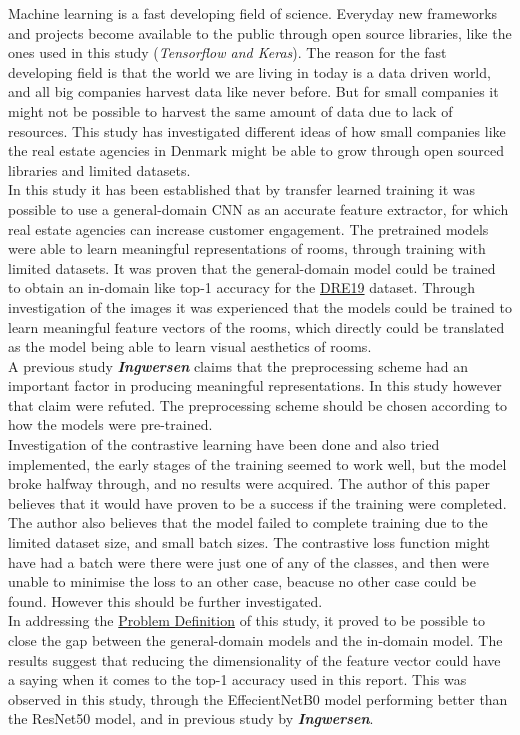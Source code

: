 Machine learning is a fast developing field of science. Everyday new frameworks and projects become available to the public through open source libraries, like the ones used in this study (\textit{Tensorflow and Keras}). The reason for the fast developing field is that the world we are living in today is a data driven world, and all big companies harvest data like never before. But for small companies it might not be possible to harvest the same amount of data due to lack of resources. This study has investigated different ideas of how small companies like the real estate agencies in Denmark might be able to grow through open sourced libraries and limited datasets.
\vspace{3mm}\\
In this study it has been established that by transfer learned training it was possible to use a general-domain CNN as an accurate feature extractor, for which real estate agencies can increase customer engagement. The pretrained models were able to learn meaningful representations of rooms, through training with limited datasets. It was proven that the general-domain model could be trained to obtain an in-domain like top-1 accuracy for the \hyperref[sec:DRE19]{DRE19} dataset. Through investigation of the images it was experienced that the models could be trained to learn meaningful feature vectors of the rooms, which directly could be translated as the model being able to learn visual aesthetics of rooms.
\vspace{3mm}\\
A previous study \textbf{\textit{Ingwersen}}\autocite{Ingwersen} claims that the preprocessing scheme had an important factor in producing meaningful representations. In this study however that claim were refuted. The preprocessing scheme should be chosen according to how the models were pre-trained.
\vspace{3mm}\\
Investigation of the contrastive learning have been done and also tried implemented, the early stages of the training seemed to work well, but the model broke halfway through, and no results were acquired. The author of this paper believes that it would have proven to be a success if the training were completed. The author also believes that the model failed to complete training due to the limited dataset size, and small batch sizes. The contrastive loss function might have had a batch were there were just one of any of the classes, and then were unable to minimise the loss to an other case, beacuse no other case could be found. However this should be further investigated.
\vspace{3mm}\\
In addressing the \hyperref[sec:Problem Definition]{Problem Definition} of this study, it proved to be possible to close the gap between the general-domain models and the in-domain model. The results suggest that reducing the dimensionality of the feature vector could have a saying when it comes to the top-1 accuracy used in this report. This was observed in this study, through the EffecientNetB0 model performing better than the ResNet50 model, and in previous study by \textbf{\textit{Ingwersen}}\autocite{Ingwersen}.

